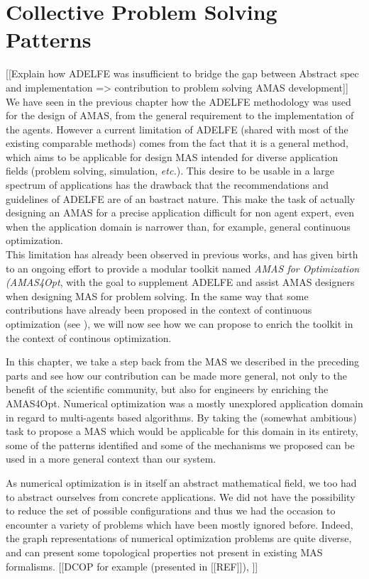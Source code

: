 \chapter{Collective Problem Solving Patterns}\label{CPSP}

[[Explain how ADELFE was insufficient to bridge the gap between Abstract spec and implementation => contribution to problem solving AMAS development]]
We have seen in the previous chapter how the ADELFE methodology was used for the design of AMAS, from the general requirement to the implementation of the agents. However a current limitation of ADELFE (shared with most of the existing comparable methods) comes from the fact that it is a general method, which aims to be applicable for design MAS intended for diverse application fields (problem solving, simulation, \emph{etc.}). This desire to be usable in a large spectrum of applications has the drawback that the recommendations and guidelines of ADELFE are of an bastract nature. This make the task of actually designing an AMAS for a precise application difficult for non agent expert, even when the application domain is narrower than, for example, general continuous optimization.\\
This limitation has already been observed in previous works, and has given birth to an ongoing effort to provide a modular toolkit named \emph{AMAS for Optimization (AMAS4Opt}, with the goal to supplement ADELFE and assist AMAS designers when designing MAS for problem solving. In the same way that some contributions have already been proposed in the context of continuous optimization (see \cite{Ka2011.6}), we will now see how we can propose to enrich the toolkit in the context of continous optimization.

In this chapter, we take a step back from the MAS we described in the preceding parts and see how our contribution can be made more general, not only to the benefit of the scientific community, but also for engineers by enriching the AMAS4Opt. Numerical optimization was a mostly unexplored application domain in regard to multi-agents based algorithms. By taking the (somewhat ambitious) task to propose a MAS which would be applicable for this domain in its entirety, some of the patterns identified and some of the mechanisms we proposed can be used in a more general context than our system.

As numerical optimization is in itself an abstract mathematical field, we too had to abstract ourselves from concrete applications. We did not have the possibility to reduce the set of possible configurations and thus we had the occasion to encounter a variety of problems which have been mostly ignored before. Indeed, the graph representations of numerical optimization problems are quite diverse, and can present some topological properties not present in existing MAS formalisms. [[DCOP for example (presented in [[REF]]), ]]

